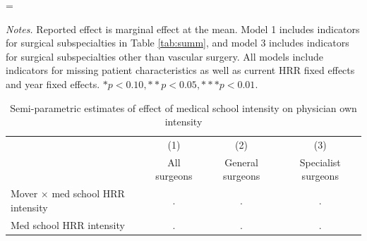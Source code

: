 \setlength{\LTpost}{0mm}
\LTcapwidth=\textwidth
\begin{ThreePartTable}
\begin{TableNotes}
    \textit{Notes.} Reported effect is marginal effect at the mean. Model 1 includes indicators for surgical subspecialties in Table \ref{tab:summ}, and model 3 includes indicators for surgical subspecialties other than vascular surgery. All models include indicators for missing patient characteristics as well as current HRR fixed effects and year fixed effects. $* p < 0.10, ** p < 0.05, *** p < 0.01$.
\end{TableNotes}
\begin{longtable}{lccc}
    \label{tab:res-spline} \\
    \caption{Semi-parametric estimates of effect of medical school intensity on physician own intensity} \\
        \toprule
         & (1) & (2) & (3) \\
         & All surgeons & General surgeons & Specialist surgeons \\
        \midrule
        Mover $\times$ med school HRR intensity & . & . & . \\
        Med school HRR intensity & . & . & . \\

\end{longtable}
\end{ThreePartTable}
